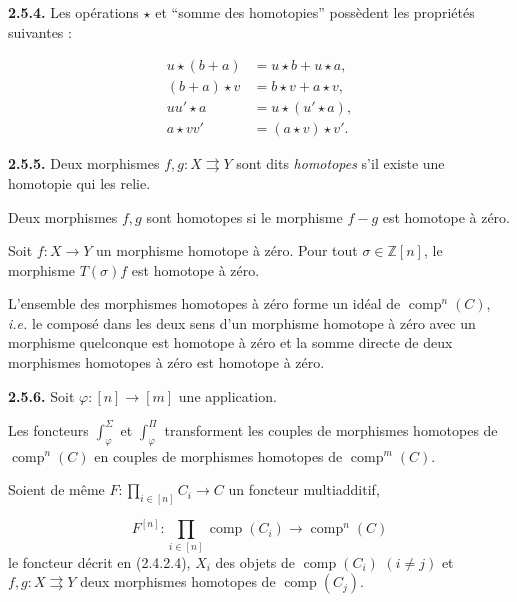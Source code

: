 %
\noindent\textbf{2.5.4.}\quad
Les opérations $\star$ et ``somme des homotopies'' possèdent les propriétés
suivantes :

\begin{equation}
  \begin{aligned}
    u\star(b+a) &= u\star b+u\star a,\\
    (b+a)\star v &= b\star v+a\star v,\\
    uu'\star a &= u\star(u'\star a),\\
    a\star vv' &= (a\star v)\star v'.
  \end{aligned}
  \tag{2.5.4.1}
\end{equation}

\noindent\textbf{2.5.5.}\quad
Deux morphismes $f,g\colon X\rightrightarrows Y$ sont dits
\emph{homotopes} s'il existe une homotopie qui les relie.

Deux morphismes $f,g$ sont homotopes si le morphisme $f-g$ est homotope à
zéro.

Soit $f\colon X\longrightarrow Y$ un morphisme homotope à zéro. Pour tout
$\sigma\in\mathbb Z[n]$, le morphisme $T(\sigma)f$ est homotope à zéro.

L'ensemble des morphismes homotopes à zéro forme un idéal de
$\operatorname{comp}^{n}(C)$, \emph{i.e.} le composé dans les deux sens d'un
morphisme homotope à zéro avec un morphisme quelconque est homotope à zéro et
la somme directe de deux morphismes homotopes à zéro est homotope à zéro.

\noindent\textbf{2.5.6.}\quad
Soit $\varphi\colon[n]\longrightarrow[m]$ une application.

Les foncteurs $\int_\varphi^\Sigma$ et $\int_\varphi^\Pi$ transforment les
couples de morphismes homotopes de $\operatorname{comp}^{n}(C)$ en couples de
morphismes homotopes de $\operatorname{comp}^{m}(C)$.

Soient de même
$F\colon\prod_{i\in[n]}C_i\longrightarrow C$ un foncteur multiadditif,

\begin{equation*}
  F^{[n]}\colon
  \prod_{i\in[n]}\operatorname{comp}(C_i)
  \longrightarrow \operatorname{comp}^{n}(C)
\end{equation*}
le foncteur décrit en (2.4.2.4), $X_i$ des objets de
$\operatorname{comp}(C_i)$ $(i\ne j)$ et
$f,g\colon X\rightrightarrows Y$ deux morphismes homotopes de
$\operatorname{comp}(C_j)$.

